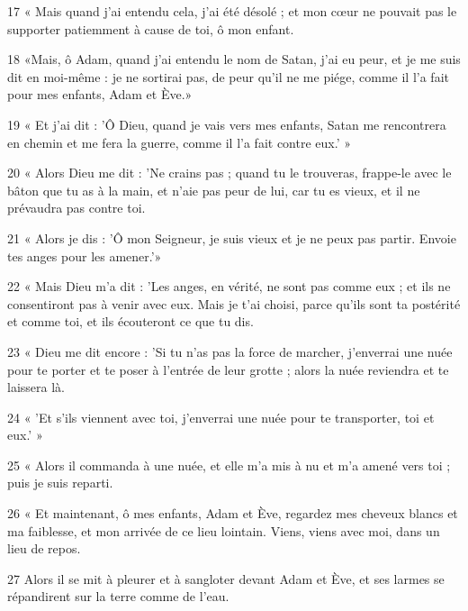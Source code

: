 \par 17 « Mais quand j'ai entendu cela, j'ai été désolé ; et mon cœur ne pouvait pas le supporter patiemment à cause de toi, ô mon enfant.

\par 18 «Mais, ô Adam, quand j'ai entendu le nom de Satan, j'ai eu peur, et je me suis dit en moi-même : je ne sortirai pas, de peur qu'il ne me piége, comme il l'a fait pour mes enfants, Adam et Ève.»

\par 19 « Et j'ai dit : 'Ô Dieu, quand je vais vers mes enfants, Satan me rencontrera en chemin et me fera la guerre, comme il l'a fait contre eux.' »

\par 20 « Alors Dieu me dit : 'Ne crains pas ; quand tu le trouveras, frappe-le avec le bâton que tu as à la main, et n'aie pas peur de lui, car tu es vieux, et il ne prévaudra pas contre toi.

\par 21 « Alors je dis : 'Ô mon Seigneur, je suis vieux et je ne peux pas partir. Envoie tes anges pour les amener.'»

\par 22 « Mais Dieu m'a dit : 'Les anges, en vérité, ne sont pas comme eux ; et ils ne consentiront pas à venir avec eux. Mais je t'ai choisi, parce qu'ils sont ta postérité et comme toi, et ils écouteront ce que tu dis.

\par 23 « Dieu me dit encore : 'Si tu n'as pas la force de marcher, j'enverrai une nuée pour te porter et te poser à l'entrée de leur grotte ; alors la nuée reviendra et te laissera là.

\par 24 « 'Et s'ils viennent avec toi, j'enverrai une nuée pour te transporter, toi et eux.' »

\par 25 « Alors il commanda à une nuée, et elle m'a mis à nu et m'a amené vers toi ; puis je suis reparti.

\par 26 « Et maintenant, ô mes enfants, Adam et Ève, regardez mes cheveux blancs et ma faiblesse, et mon arrivée de ce lieu lointain. Viens, viens avec moi, dans un lieu de repos.

\par 27 Alors il se mit à pleurer et à sangloter devant Adam et Ève, et ses larmes se répandirent sur la terre comme de l'eau.

